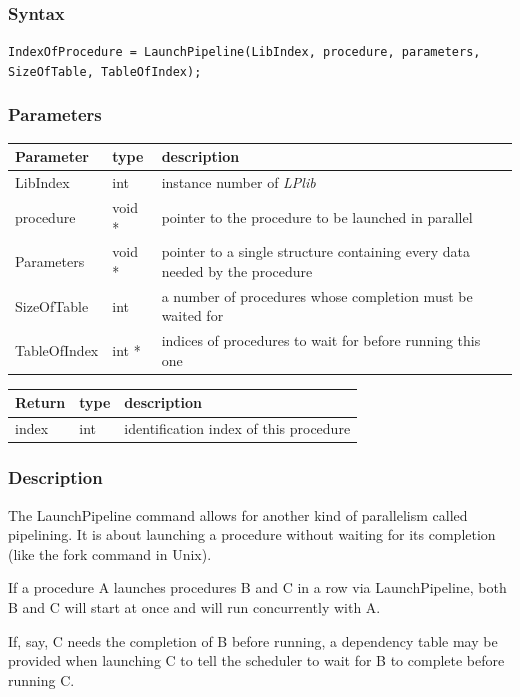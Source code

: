 \documentclass[a4paper,12pt]{article}
\begin{document}
\subsubsection*{Syntax}
\tt{IndexOfProcedure = LaunchPipeline(LibIndex, procedure, parameters, SizeOfTable, TableOfIndex);}
\normalfont

\subsubsection*{Parameters}
\begin{tabular}{|m{3cm}|m{1.5cm}|m{10.5cm}|}
\hline
Parameter    & type   & description \\
\hline
LibIndex     & int    & instance number of \emph{LPlib} \\
\hline
procedure    & void * & pointer to the procedure to be launched in parallel \\
\hline
Parameters   & void * & pointer to a single structure containing every data needed by the procedure \\
\hline
SizeOfTable  & int    & a number of procedures whose completion must be waited for \\
\hline
TableOfIndex & int *  & indices of procedures to wait for before running this one \\
\hline
\end{tabular}

\medskip

\noindent
\begin{tabular}{|m{3cm}|m{1.5cm}|m{10.5cm}|}
\hline
Return       & type   & description \\
\hline
index        & int    & identification index of this procedure \\
\hline
\end{tabular}

\subsubsection*{Description}
The LaunchPipeline command allows for another kind of parallelism called pipelining. It is about launching a procedure without waiting for its completion (like the fork command in Unix).

If a procedure A launches procedures B and C in a row via LaunchPipeline, both B and C will start at once and will run concurrently with A.

If, say, C needs the completion of B before running, a dependency table may be provided when launching C to tell the scheduler to wait for B to complete before running C.
\end{document}
